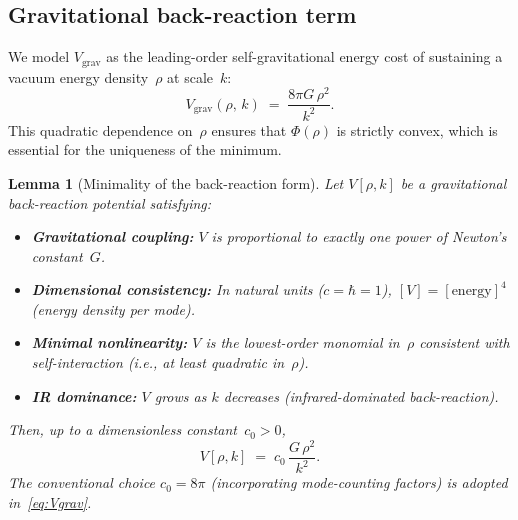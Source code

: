\documentclass[12pt,a4paper]{article}
\theoremstyle{definition}
\theoremstyle{plain}
\newtheorem{lemma}[definition]{Lemma}
\theoremstyle{remark}
\begin{document}
\subsection{Gravitational back-reaction term}

We model $V_{\mathrm{grav}}$ as the leading-order self-gravitational
energy cost of sustaining a vacuum energy density~$\rho$ at scale~$k$:
\begin{equation}\label{eq:Vgrav}
  V_{\mathrm{grav}}(\rho,\,k) \;=\;
  \frac{8\pi G\,\rho^{2}}{k^{2}}.
\end{equation}
This quadratic dependence on~$\rho$ ensures that $\Phi(\rho)$ is
strictly convex, which is essential for the uniqueness of the minimum.

\begin{lemma}[Minimality of the back-reaction form]\label{lem:minimality}
Let $V[\rho, k]$ be a gravitational back-reaction potential satisfying:
\begin{itemize}
    \item[\textup{(M1)}] \textbf{Gravitational coupling:} $V$ is proportional to exactly one power of Newton's constant~$G$.
    \item[\textup{(M2)}] \textbf{Dimensional consistency:} In natural units ($c = \hbar = 1$), $[V] = [\mathrm{energy}]^4$ (energy density per mode).
    \item[\textup{(M3)}] \textbf{Minimal nonlinearity:} $V$ is the \emph{lowest-order} monomial in~$\rho$ consistent with self-interaction (i.e., at least quadratic in~$\rho$).
    \item[\textup{(M4)}] \textbf{IR dominance:} $V$ grows as $k$ decreases (infrared-dominated back-reaction).
\end{itemize}
Then, up to a dimensionless constant~$c_0 > 0$,
\[
V[\rho, k] \;=\; c_0\,\frac{G\,\rho^2}{k^2}.
\]
The conventional choice $c_0 = 8\pi$ (incorporating mode-counting
factors) is adopted in~\eqref{eq:Vgrav}.
\end{lemma}
\end{document}
